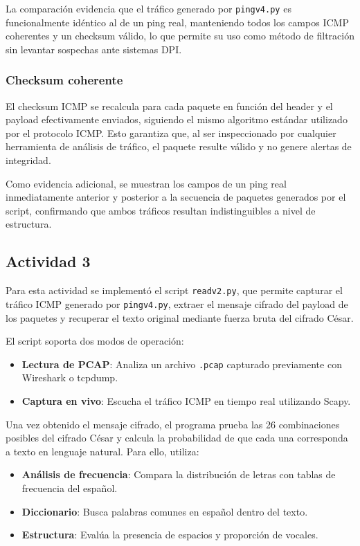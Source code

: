 \documentclass[letter,12pt]{article}
\begin{document}
La comparación evidencia que el tráfico generado por \texttt{pingv4.py} es funcionalmente idéntico al de un ping real, manteniendo todos los campos ICMP coherentes y un checksum válido, lo que permite su uso como método de filtración sin levantar sospechas ante sistemas DPI.



\subsubsection*{Checksum coherente}

El checksum ICMP se recalcula para cada paquete en función del header y el payload
efectivamente enviados, siguiendo el mismo algoritmo estándar utilizado por el
protocolo ICMP. Esto garantiza que, al ser inspeccionado por cualquier herramienta
de análisis de tráfico, el paquete resulte válido y no genere alertas de
integridad.

Como evidencia adicional, se muestran los campos de un ping real inmediatamente
anterior y posterior a la secuencia de paquetes generados por el script,
confirmando que ambos tráficos resultan indistinguibles a nivel de estructura.


\subsection{Actividad 3}

Para esta actividad se implementó el script \texttt{readv2.py}, que permite capturar el tráfico ICMP generado por \texttt{pingv4.py}, extraer el mensaje cifrado del payload de los paquetes y recuperar el texto original mediante fuerza bruta del cifrado César.

El script soporta dos modos de operación:
\begin{itemize}
    \item \textbf{Lectura de PCAP}: Analiza un archivo \texttt{.pcap} capturado previamente con Wireshark o tcpdump.
    \item \textbf{Captura en vivo}: Escucha el tráfico ICMP en tiempo real utilizando Scapy.
\end{itemize}

Una vez obtenido el mensaje cifrado, el programa prueba las 26 combinaciones posibles del cifrado César y calcula la probabilidad de que cada una corresponda a texto en lenguaje natural. Para ello, utiliza:
\begin{itemize}
    \item \textbf{Análisis de frecuencia}: Compara la distribución de letras con tablas de frecuencia del español.
    \item \textbf{Diccionario}: Busca palabras comunes en español dentro del texto.
    \item \textbf{Estructura}: Evalúa la presencia de espacios y proporción de vocales.
\end{itemize}
\end{document}
